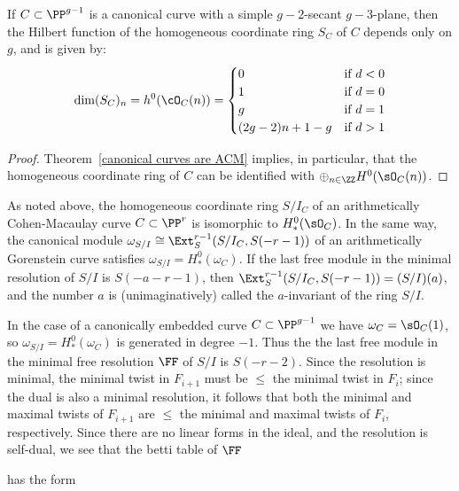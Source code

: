  \begin{corollary}\label{canonical hilbert function}
If $C\subset \PP^{g-1}$ is a canonical curve with a simple $g-2$-secant $g-3$-plane, then the Hilbert function of the homogeneous coordinate ring $S_{C}$ of  $C$ depends only on $g$, and is given by:
$$
\dim({S_{C}})_{n} = h^{0}(\cO_{C}(n)) = 
\begin{cases}
 0 &\mbox {if } d<0\\
 1 & \mbox {if }  d=0\\
 g & \mbox {if }  d=1\\
 (2g-2)n + 1 - g & \mbox {if }  d>1\\
\end{cases}
$$
\end{corollary}
\begin{proof}
Theorem~\ref{canonical curves are ACM} implies, in particular, that the homogeneous coordinate ring of $C$ can be identified with $\oplus_{n \in \ZZ} H^0(\sO_C(n))$.  
\end{proof}

 As noted above, the homogeneous coordinate ring $S/I_C$ of an arithmetically Cohen-Macaulay curve $C\subset \PP^r$ is isomorphic
 to $H^0_*(\sO_C)$. In the same way, the canonical module $\omega_{S/I} \cong \Ext_S^{r-1}(S/I_C, S(-r-1))$ of an arithmetically Gorenstein curve satisfies
 $\omega_{S/I} = H^0_*(\omega_C)$.  If the last free module in the minimal resolution of $S/I$ is $S(-a-r-1)$,
 then $\Ext_S^{r-1}(S/I_C, S(-r-1)) = (S/I)(a)$, and the number $a$ is (unimaginatively) called the $a$-invariant
 of the ring $S/I$.
 
 In the case of a canonically embedded curve $C\subset \PP^{g-1}$ we have $\omega_C = \sO_C(1)$, 
 so  $\omega_{S/I}= H^0_*(\omega_C)$ is generated in degree $-1$. Thus the  the last
 free module in the minimal free resolution $\FF$ of $S/I$ is $S(-r-2)$. Since the resolution is minimal,
 the minimal  twist in $F_{i+1}$ must be $\leq$ the minimal twist in $F_i$; since the dual is also a minimal resolution,
 it follows that both the minimal and maximal twists of $F_{i+1}$ are $\leq$ the minimal and maximal twists of $F_i$, respectively.
 Since there are no linear forms in the ideal, and the resolution is self-dual, we see that the betti table of $\FF$ 
 
 
 has the form

